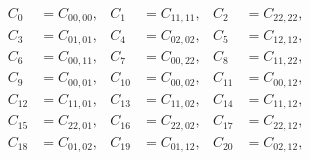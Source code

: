 \begin{equation}\begin{aligned}
C_{0} &= C_{00,00},  & C_{1} &= C_{11,11},  & C_{2} &= C_{22,22}, \\
C_{3} &= C_{01,01},  & C_{4} &= C_{02,02},  & C_{5} &= C_{12,12}, \\
C_{6} &= C_{00,11},  & C_{7} &= C_{00,22},  & C_{8} &= C_{11,22}, \\
C_{9} &= C_{00,01},  & C_{10} &= C_{00,02},  & C_{11} &= C_{00,12}, \\
C_{12} &= C_{11,01},  & C_{13} &= C_{11,02},  & C_{14} &= C_{11,12}, \\
C_{15} &= C_{22,01},  & C_{16} &= C_{22,02},  & C_{17} &= C_{22,12}, \\
C_{18} &= C_{01,02},  & C_{19} &= C_{01,12},  & C_{20} &= C_{02,12}, \\
\end{aligned}\end{equation}


